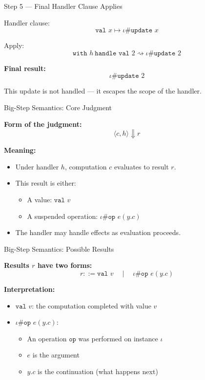 \begin{frame}{Step 5 — Final Handler Clause Applies}

Handler clause:
\[
\texttt{val } x \mapsto \iota \# \texttt{update } x
\]

Apply:
\[
\texttt{with } h\ \texttt{handle val } 2
\rightsquigarrow
\iota \# \texttt{update } 2
\]

\vspace{1em}
\textbf{Final result:}
\[
\iota \# \texttt{update } 2
\]

This update is not handled — it escapes the scope of the handler.
\end{frame}

\begin{frame}{Big-Step Semantics: Core Judgment}

\textbf{Form of the judgment:}
\[
\langle c, h \rangle \Downarrow r
\]

\textbf{Meaning:}
\begin{itemize}
  \item Under handler \( h \), computation \( c \) evaluates to result \( r \).
  \item This result is either:
    \begin{itemize}
      \item A value: \( \texttt{val } v \)
      \item A suspended operation: \( \iota \# \texttt{op } e (y.c) \)
    \end{itemize}
  \item The handler may handle effects as evaluation proceeds.
\end{itemize}
\end{frame}

\begin{frame}{Big-Step Semantics: Possible Results}

\textbf{Results \( r \) have two forms:}
\[
r ::= \texttt{val } v \quad \mid \quad \iota \# \texttt{op } e (y.c)
\]

\textbf{Interpretation:}
\begin{itemize}
  \item \( \texttt{val } v \): the computation completed with value \( v \)
  \item \( \iota \# \texttt{op } e (y.c) \):
    \begin{itemize}
      \item An operation \( \texttt{op} \) was performed on instance \( \iota \)
      \item \( e \) is the argument
      \item \( y.c \) is the continuation (what happens next)
    \end{itemize}
\end{itemize}
\end{frame}

